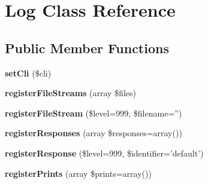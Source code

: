 \hypertarget{class_utopia_1_1_components_1_1_logger_1_1_log}{
\section{Log Class Reference}
\label{class_utopia_1_1_components_1_1_logger_1_1_log}
}
\subsection*{Public Member Functions}
\begin{DoxyCompactItemize}
\item 
\hypertarget{class_utopia_1_1_components_1_1_logger_1_1_log_ac6a14d15c340a54c1822063be2f453f4}{
{\bfseries setCli} (\$cli)}
\label{class_utopia_1_1_components_1_1_logger_1_1_log_ac6a14d15c340a54c1822063be2f453f4}

\item 
\hypertarget{class_utopia_1_1_components_1_1_logger_1_1_log_a882b9f7a326635eca4ff1b5531de18ff}{
{\bfseries registerFileStreams} (array \$files)}
\label{class_utopia_1_1_components_1_1_logger_1_1_log_a882b9f7a326635eca4ff1b5531de18ff}

\item 
\hypertarget{class_utopia_1_1_components_1_1_logger_1_1_log_a54f03ec791a548df9b91171d03dbd74f}{
{\bfseries registerFileStream} (\$level=999, \$filename='')}
\label{class_utopia_1_1_components_1_1_logger_1_1_log_a54f03ec791a548df9b91171d03dbd74f}

\item 
\hypertarget{class_utopia_1_1_components_1_1_logger_1_1_log_a3623e1fd216b95b20eeb0a751b66e800}{
{\bfseries registerResponses} (array \$responses=array())}
\label{class_utopia_1_1_components_1_1_logger_1_1_log_a3623e1fd216b95b20eeb0a751b66e800}

\item 
\hypertarget{class_utopia_1_1_components_1_1_logger_1_1_log_aa312b27a8a9e59c50bdf81f1b826d60b}{
{\bfseries registerResponse} (\$level=999, \$identifier='default')}
\label{class_utopia_1_1_components_1_1_logger_1_1_log_aa312b27a8a9e59c50bdf81f1b826d60b}

\item 
\hypertarget{class_utopia_1_1_components_1_1_logger_1_1_log_a4e28a7c244c6521e8b2cc63de10d6bf3}{
{\bfseries registerPrints} (array \$prints=array())}
\label{class_utopia_1_1_components_1_1_logger_1_1_log_a4e28a7c244c6521e8b2cc63de10d6bf3}


\end{DoxyCompactItemize}
